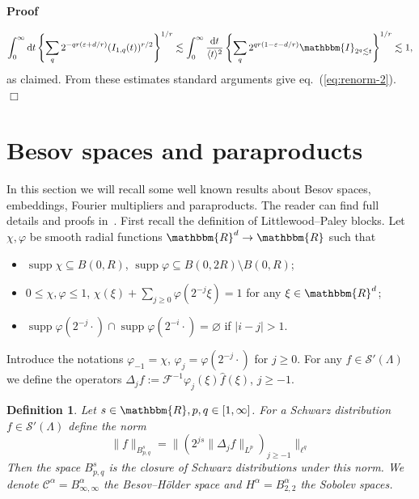 \documentclass[11pt, oneside]{article}   	%
\newcommand{\assign}{:=}
\newcommand{\mathd}{\mathrm{d}}
\newcommand{\tmop}[1]{\ensuremath{\operatorname{#1}}}
\newenvironment{proof}{\noindent\textbf{Proof\ }}{\hspace*{\fill}$\Box$\medskip}
\newtheorem{definition}{Definition}
\newcommand{\VV}{\mathscr{C}}
\newcommand{\CS}{\mathscr{S}}
\begin{document}
\begin{proof}
  
  \[ \int^{\infty}_0 \mathd t \left\{ \sum_q 2^{- q r (\varepsilon + d / r)} 
     (I_{1, q} (t))^{r / 2} \right\}^{1 / r} \lesssim \int^{\infty}_0
     \frac{\mathd t}{\langle t \rangle^2} \left\{ \sum_q 2^{q r (1 -
     \varepsilon - d / r)} \mathbbm{I}_{2^q \lesssim t} \right\}^{1 / r}
     \lesssim 1, \]
  as claimed. From these estimates standard arguments give
  eq.~(\ref{eq:renorm-2}).
\end{proof}

\appendix\section{Besov spaces and paraproducts}\label{sec:appendix-para}

In this section we will recall some well known results about Besov spaces,
embeddings, Fourier multipliers and paraproducts. The reader can find full
details and proofs
in~{\cite{bahouri_fourier_2011,gubinelli_paracontrolled_2015}}. First recall
the definition of Littlewood--Paley blocks. Let $\chi, \varphi$ be smooth
radial functions $\mathbbm{R}^d \rightarrow \mathbbm{R}$ such that
\begin{itemize}
  \item $\tmop{supp} \chi \subseteq B (0, R)$, $\tmop{supp} \varphi \subseteq
  B (0, 2 R) \setminus B (0, R)$;
  
  \item $0 \leqslant \chi, \varphi \leqslant 1$, $\chi (\xi) + \sum_{j \geq 0}
  \varphi (2^{- j} \xi) = 1$ for any $\xi \in \mathbbm{R}^d$;
  
  \item $\tmop{supp} \varphi (2^{- j} \cdot) \cap \tmop{supp} \varphi (2^{- i}
  \cdot) = \varnothing$ if $| i - j | > 1$.
\end{itemize}
Introduce the notations $\varphi_{- 1} = \chi$, $\varphi_j = \varphi (2^{- j}
\cdot)$ for $j \geqslant 0$. For any $f \in \CS' (\Lambda)$ we define the
operators $\Delta_j f \assign \mathcal{F}^{- 1} \varphi_j (\xi) \hat{f}
(\xi)$, $j \geqslant - 1$.

\begin{definition}
  Let $s \in \mathbbm{R}, p, q \in [1, \infty]$. For a Schwarz distribution $f
  \in \CS' (\Lambda)$ define the norm
  \[ \| f \|_{B_{p, q}^s} = \| (2^{j s} \| \Delta_j f \|_{L^p})_{j \geqslant
     - 1} \|_{\ell^q} \]
  Then the space $B^s_{p, q}$ is the closure of Schwarz distributions under
  this norm. We denote $\VV^{\alpha} = B_{\infty, \infty}^{\alpha}$ the
  Besov--H{\"o}lder space and $H^{\alpha} = B^{\alpha}_{2, 2}$ the Sobolev
  spaces. \ 
\end{definition}
\end{document}
